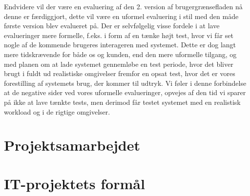 \documentclass{article}
\begin{document}
Endvidere vil der være en evaluering af den 2. version af brugergrænsefladen nå denne er færdiggjort, dette vil være en uformel evaluering i stil med den måde første version blev evalueret på. 
Der er selvfølgelig visse fordele i at lave evalueringer mere formelle, f.eks. i form af en tænke højt test, hvor vi får set nogle af de kommende brugeres interageren med systemet. Dette er dog langt mere tidskrævende for både os og kunden, end den mere uformelle tilgang, og med planen om at lade systemet gennemløbe en test periode, hvor det bliver brugt i fuldt ud realistiske omgivelser fremfor en opsat test, hvor det er vores forestilling af systemets brug, der kommer til udtryk. 
Vi føler i denne forbindelse at de negative sider ved vores uformelle evalueringer, opvejes af den tid vi sparer på ikke at lave tænkte tests, men derimod får testet systemet med en realistisk workload og i de rigtige omgivelser.

\section{Projektsamarbejdet}

\section{IT-projektets formål}
\end{document}

